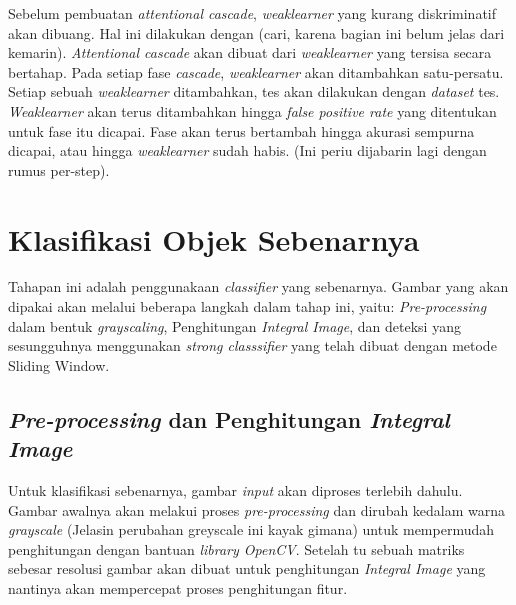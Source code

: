 Sebelum pembuatan \emph{attentional cascade}, \emph{weaklearner} yang kurang 
diskriminatif akan dibuang. Hal ini dilakukan dengan (cari, karena bagian ini 
belum jelas dari kemarin). \emph{Attentional cascade} akan dibuat dari \emph{weaklearner} 
yang tersisa secara bertahap. Pada setiap fase \emph{cascade}, \emph{weaklearner} akan 
ditambahkan satu-persatu. Setiap sebuah \emph{weaklearner} ditambahkan, tes akan dilakukan 
dengan \emph{dataset} tes. \emph{Weaklearner} akan terus ditambahkan hingga \emph{false positive rate} 
yang ditentukan untuk fase itu dicapai. Fase akan terus bertambah hingga 
akurasi sempurna dicapai, atau hingga \emph{weaklearner} sudah habis. (Ini periu 
dijabarin lagi dengan rumus per-step).

\section{Klasifikasi Objek Sebenarnya}

Tahapan ini adalah penggunakaan \emph{classifier} yang sebenarnya. 
Gambar yang akan dipakai akan melalui beberapa langkah dalam tahap ini, 
yaitu: \textit{Pre-processing} dalam bentuk \emph{grayscaling}, Penghitungan 
\emph{Integral Image}, dan deteksi yang sesungguhnya menggunakan \emph{strong classsifier} 
yang telah dibuat dengan metode Sliding Window.

\subsection{\textit{Pre-processing} dan Penghitungan \emph{Integral Image}}

Untuk klasifikasi sebenarnya, gambar \emph{input} akan diproses terlebih dahulu. 
Gambar awalnya akan melakui proses \textit{pre-processing} dan dirubah kedalam warna 
\emph{grayscale} (Jelasin perubahan greyscale ini kayak gimana) 
untuk mempermudah penghitungan dengan bantuan \emph{library OpenCV}. 
Setelah tu sebuah matriks sebesar resolusi gambar akan dibuat untuk 
penghitungan \emph{Integral Image} yang nantinya akan mempercepat proses 
penghitungan fitur.

